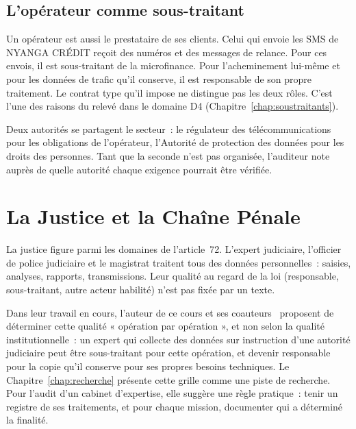 \subsection{L'opérateur comme sous-traitant}

Un opérateur est aussi le prestataire de ses clients. Celui qui envoie les
SMS de NYANGA CRÉDIT reçoit des numéros et des messages de relance. Pour
ces envois, il est sous-traitant de la microfinance. Pour l'acheminement
lui-même et pour les données de trafic qu'il conserve, il est responsable
de son propre traitement. Le contrat type qu'il impose ne distingue pas
les deux rôles. C'est l'une des raisons du \NEK{} relevé dans le domaine
D4 (Chapitre~\ref{chap:soustraitants}).

Deux autorités se partagent le secteur~: le régulateur des
télécommunications pour les obligations de l'opérateur, l'Autorité de
protection des données pour les droits des personnes. Tant que la seconde
n'est pas organisée, l'auditeur note auprès de quelle autorité chaque
exigence pourrait être vérifiée.

\section{La Justice et la Chaîne Pénale}
\label{sec:c15-justice}

La justice figure parmi les domaines de l'article~72. L'expert judiciaire,
l'officier de police judiciaire et le magistrat traitent tous des données
personnelles~: saisies, analyses, rapports, transmissions. Leur qualité au
regard de la loi (responsable, sous-traitant, autre acteur habilité) n'est
pas fixée par un texte.

Dans leur travail en cours, l'auteur de ce cours et ses
coauteurs~\cite{minka2026chainepenale} proposent de déterminer cette qualité
« opération par opération », et non selon la qualité institutionnelle~:
un expert qui collecte des données sur instruction d'une autorité
judiciaire peut être sous-traitant pour cette opération, et devenir
responsable pour la copie qu'il conserve pour ses propres besoins
techniques. Le Chapitre~\ref{chap:recherche} présente cette grille comme
une piste de recherche. Pour l'audit d'un cabinet d'expertise, elle
suggère une règle pratique~: tenir un registre de ses traitements, et
pour chaque mission, documenter qui a déterminé la finalité.


